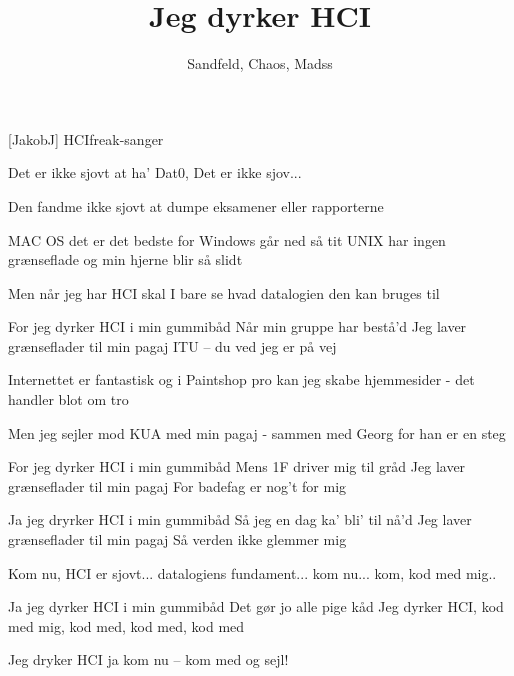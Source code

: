 \documentclass[a4paper,11pt]{article}
\title{Jeg dyrker HCI}
\author{Sandfeld, Chaos, Madss}
\begin{document}
\maketitle

\begin{roles}
[JakobJ] HCIfreak-sanger
\end{roles}

\begin{props}
\end{props}

\begin{song}
 Det er ikke sjovt at ha' Dat0,
Det er ikke sjov...

Den fandme ikke sjovt at dumpe eksamener
eller rapporterne

MAC OS det er det bedste
for Windows går ned så tit
UNIX har ingen grænseflade
og min hjerne blir så slidt

Men når jeg har HCI skal I bare se
hvad datalogien den kan bruges til

For jeg dyrker HCI i min gummibåd
Når min gruppe har bestå'd
Jeg laver grænseflader til min pagaj
ITU -- du ved jeg er på vej

Internettet er fantastisk
og i Paintshop pro
kan jeg skabe hjemmesider
- det handler blot om tro

Men jeg sejler mod KUA med min pagaj
- sammen med Georg for han er en steg

For jeg dyrker HCI i min gummibåd
Mens 1F driver mig til gråd
Jeg laver grænseflader til min pagaj
For badefag er nog't for mig

Ja jeg dryrker HCI i min gummibåd
Så jeg en dag ka' bli' til nå'd
Jeg laver grænseflader til min pagaj
Så verden ikke glemmer mig

Kom nu, HCI er sjovt... datalogiens fundament... kom nu... kom,
kod med mig..

Ja jeg dyrker HCI i min gummibåd
Det gør jo alle pige kåd
Jeg dyrker HCI,
kod med mig, kod med, kod med, kod med

Jeg dryker HCI
ja kom nu -- kom med og sejl!

\end{song}
\end{document}
